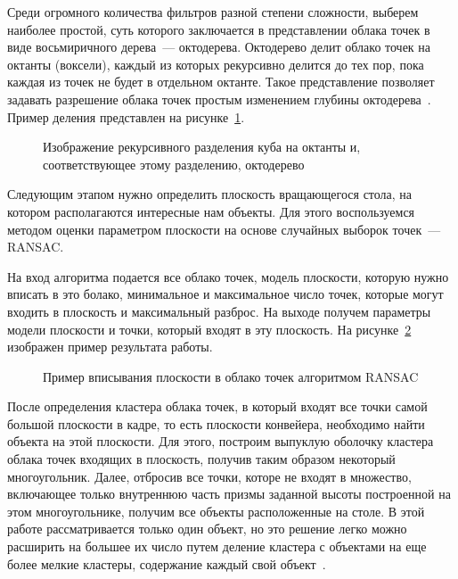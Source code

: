 Среди огромного количества фильтров разной степени сложности, выберем наиболее простой, суть которого заключается в представлении облака точек в виде восьмиричного дерева~--- октодерева. Октодерево делит облако точек на октанты (воксели), каждый из которых рекурсивно делится до тех пор, пока каждая из точек не будет в отдельном октанте. Такое представление позволяет задавать разрешение облака точек простым изменением глубины октодерева~\cite{moreno2016comparative}. Пример деления представлен на рисунке~\ref{img:octree}.

\begin{figure}[h!]
	\vspace{0.5cm}
	\caption{Изображение рекурсивного разделения куба на октанты и, соответствующее этому разделению, октодерево}
	\label{img:octree}
\end{figure}

Следующим этапом нужно определить плоскость вращающегося стола, на котором располагаются интересные нам объекты. Для этого воспользуемся методом оценки параметром плоскости на основе случайных выборок точек~--- RANSAC.

На вход алгоритма подается все облако точек, модель плоскости, которую нужно вписать в это болако, минимальное и максимальное число точек, которые могут входить в плоскость и максимальный разброс. На выходе получем параметры модели плоскости и точки, который входят в эту плоскость. На рисунке~\ref{img:plane} изображен пример результата работы. 

\begin{figure}[h!]
	\vspace{0.5cm}
	\caption{Пример вписывания плоскости в облако точек алгоритмом RANSAC}
	\label{img:plane}
\end{figure}

После определения кластера облака точек, в который входят все точки самой большой плоскости в кадре, то есть плоскости конвейера, необходимо найти объекта на этой плоскости. Для этого, построим выпуклую оболочку кластера облака точек входящих в плоскость, получив таким образом некоторый многоугольник. Далее, отбросив все точки, которе не входят в множество, включающее только внутреннюю часть призмы заданной высоты построенной на этом многоугольнике, получим все объекты расположенные на столе. В этой работе рассматривается только один объект, но это решение легко можно расширить на большее их число путем деление кластера с объектами на еще более мелкие кластеры, содержание каждый свой объект~\cite{toold3dthesis}.

